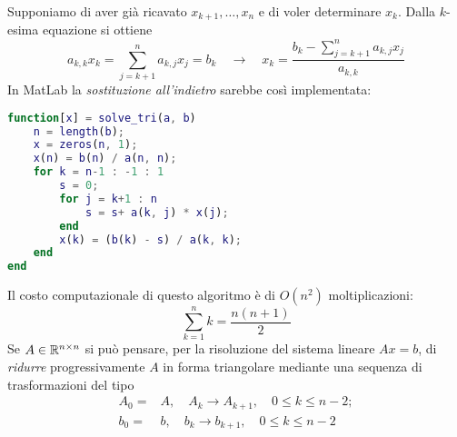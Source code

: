 Supponiamo di aver già ricavato $x_{k+1}, \dots, x_n$ e di voler determinare $x_k$. Dalla $k$-esima equazione si
ottiene
\[
	a_{k,k} x_k = \sum_{j=k+1}^n a_{k,j} x_j = b_k \quad \to \quad
	x_k = \frac{b_k - \displaystyle\sum_{j=k+1}^n a_{k,j} x_j}{a_{k,k}}
\]
In MatLab la \emph{sostituzione all'indietro} sarebbe così implementata:
\begin{lstlisting}[language=matlab]
function[x] = solve_tri(a, b)
	n = length(b);
	x = zeros(n, 1);
	x(n) = b(n) / a(n, n);
	for k = n-1 : -1 : 1
		s = 0;
		for j = k+1 : n
			s = s+ a(k, j) * x(j);
		end
		x(k) = (b(k) - s) / a(k, k);
	end
end
\end{lstlisting}
Il costo computazionale di questo algoritmo è di $O(n^2)$ moltiplicazioni:
\[ \sum_{k=1}^n k = \frac{n (n + 1)}{2} \]
Se $A \in \mathbb{R}^{n \times n}$ si può pensare, per la risoluzione del sistema lineare $A x = b$, di \emph{ridurre}
progressivamente $A$ in forma triangolare mediante una sequenza di trasformazioni del tipo
\begin{align*}
	A_0 = & A, \quad A_k \to A_{k+1}, \quad 0 \leq k \leq n - 2; \\
	b_0 = & b, \quad b_k \to b_{k+1}, \quad 0 \leq k \leq n - 2
\end{align*}
